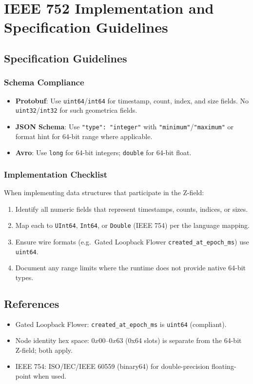\chapter{IEEE 752 Implementation and Specification Guidelines}
\label{ch:ieee752-spec-guidelines}

\section{Specification Guidelines}

\subsection{Schema Compliance}

\begin{itemize}
    \item \textbf{Protobuf}: Use \texttt{uint64}/\texttt{int64} for timestamp, count, index, and size fields. No \texttt{uint32}/\texttt{int32} for such geometrica fields.
    \item \textbf{JSON Schema}: Use \texttt{"type": "integer"} with \texttt{"minimum"}/\texttt{"maximum"} or format hint for 64-bit range where applicable.
    \item \textbf{Avro}: Use \texttt{long} for 64-bit integers; \texttt{double} for 64-bit float.
\end{itemize}

\subsection{Implementation Checklist}

When implementing data structures that participate in the Z-field:

\begin{enumerate}
    \item Identify all numeric fields that represent timestamps, counts, indices, or sizes.
    \item Map each to \texttt{UInt64}, \texttt{Int64}, or \texttt{Double} (IEEE 754) per the language mapping.
    \item Ensure wire formats (e.g.\ Gated Loopback Flower \texttt{created\_at\_epoch\_ms}) use \texttt{uint64}.
    \item Document any range limits where the runtime does not provide native 64-bit types.
\end{enumerate}

\section{References}

\begin{itemize}
    \item Gated Loopback Flower: \texttt{created\_at\_epoch\_ms} is \texttt{uint64} (compliant).
    \item Node identity hex space: \(0x00\)--\(0x63\) (0x64 slots) is separate from the 64-bit Z-field; both apply.
    \item IEEE 754: ISO/IEC/IEEE 60559 (binary64) for double-precision floating-point when used.
\end{itemize}
